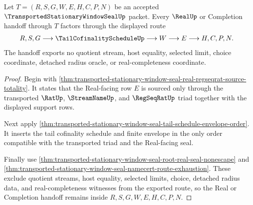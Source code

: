 \begin{theorem}
\label{thm:transported-stationary-window-seal-real-handoff-nonescape}
Let $T=(R,S,G,W,E,H,C,P,N)$ be an accepted $\TransportedStationaryWindowSealUp$ packet. Every $\RealUp$ or Completion handoff through $T$ factors through the displayed route
$$
\begin{aligned}
  R,S,G
  \longrightarrow
  \TailCofinalityScheduleUp
  \longrightarrow
  W
  \longrightarrow
  E
  \longrightarrow
  H,C,P,N .
\end{aligned}
$$
The handoff exports no quotient stream, host equality, selected limit, choice coordinate, detached radius oracle, or real-completeness coordinate.
\end{theorem}
\begin{proof}
Begin with \autoref{thm:transported-stationary-window-seal-real-regseqrat-source-totality}. It states that the Real-facing row $E$ is sourced only through the transported $\RatUp$, $\StreamNameUp$, and $\RegSeqRatUp$ triad together with the displayed support rows.

Next apply \autoref{thm:transported-stationary-window-seal-tail-schedule-envelope-order}. It inserts the tail cofinality schedule and finite envelope in the only order compatible with the transported triad and the Real-facing seal.

Finally use \autoref{thm:transported-stationary-window-seal-root-real-seal-nonescape} and \autoref{thm:transported-stationary-window-seal-namecert-route-exhaustion}. These exclude quotient streams, host equality, selected limits, choice, detached radius data, and real-completeness witnesses from the exported route, so the Real or Completion handoff remains inside $R,S,G,W,E,H,C,P,N$.
\end{proof}
